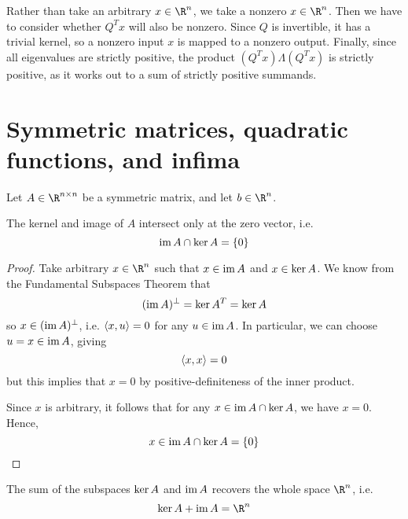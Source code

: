 \documentclass[11pt,letterpaper]{article}
\begin{document}
Rather than take an arbitrary $x \in \R^n$, we take a nonzero $x \in \R^n$.
Then we have to consider whether $Q^T x$ will also be nonzero.
Since $Q$ is invertible, it has a trivial kernel, so a nonzero input $x$ is
mapped to a nonzero output. Finally, since all eigenvalues are strictly
positive, the product $(Q^T x) \Lambda (Q^T x)$ is strictly positive, as it
works out to a sum of strictly positive summands.

\section{Symmetric matrices, quadratic functions, and infima}

Let $A \in \R^{n \times n}$ be a symmetric matrix, and let $b \in \R^n$.

\begin{prop}
    The kernel and image of $A$ intersect only at the zero vector, i.e.
    \begin{equation*}
        \operatorname{im} A \cap \operatorname{ker} A = \left\{0\right\}
    \end{equation*}
\end{prop}

\begin{proof}
    Take arbitrary $x \in \R^n$
    such that $x \in \operatorname{im} A$ and $x \in \operatorname{ker} A$.
    We know from the Fundamental Subspaces Theorem that
    \begin{equation*}
        (\operatorname{im} A)^\perp = \operatorname{ker} A^T = \operatorname{ker} A
    \end{equation*}
    so $x \in (\operatorname{im} A)^\perp$, i.e. $\langle x, u\rangle = 0$ for any $u \in \operatorname{im} A$.
    In particular, we can choose $u = x \in \operatorname{im} A$, giving
    \begin{equation*}
        \langle x, x\rangle = 0
    \end{equation*}
    but this implies that $x = 0$ by positive-definiteness of the inner
    product.

    Since $x$ is arbitrary, it follows that for any
    $x \in \operatorname{im} A \cap \operatorname{ker} A$, we have $x = 0$.
    Hence,
    \begin{equation*}
        x \in \operatorname{im} A \cap \operatorname{ker} A = \left\{0\right\}
    \end{equation*}
\end{proof}

\begin{prop}
    The sum of the subspaces $\operatorname{ker} A$ and $\operatorname{im} A$ recovers the whole space
    $\R^n$, i.e.
    \begin{equation*}
        \vker A + \im A = \R^n
    \end{equation*}
\end{prop}
\end{document}
